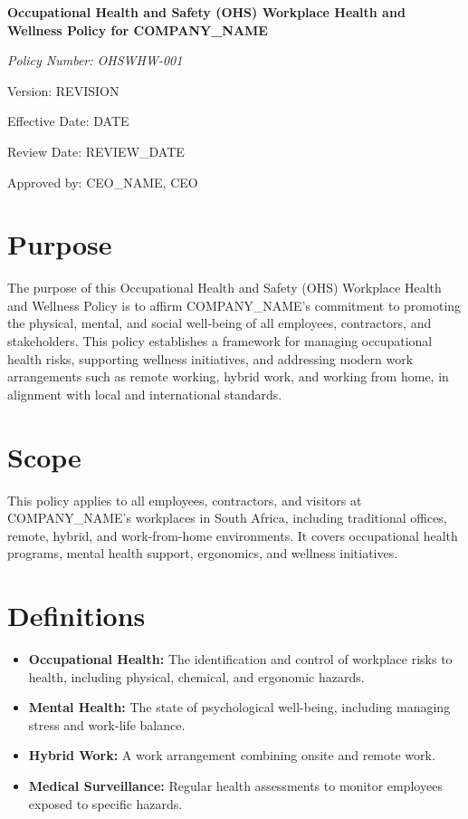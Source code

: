 \documentclass[12pt]{article}
\begin{document}
\begin{titlepage}
    \centering
    \vspace*{2cm}
    {\LARGE\bfseries Occupational Health and Safety (OHS) Workplace Health and Wellness Policy for {{COMPANY_NAME}}\par}
    \vspace{1cm}
    {\large\itshape Policy Number: OHSWHW-001\par}
    \vspace{0.5cm}
    {\normalsize Version: {{REVISION}}\par}
    \vspace{0.5cm}
    {\normalsize Effective Date: {{DATE}}\par}
    \vspace{0.5cm}
    {\normalsize Review Date: {{REVIEW_DATE}}\par}
    \vspace{2cm}
    {\normalsize Approved by: {{CEO_NAME}}, CEO\par}
\end{titlepage}

\section{Purpose}
The purpose of this Occupational Health and Safety (OHS) Workplace Health and Wellness Policy is to affirm {{COMPANY_NAME}}'s commitment to promoting the physical, mental, and social well-being of all employees, contractors, and stakeholders. This policy establishes a framework for managing occupational health risks, supporting wellness initiatives, and addressing modern work arrangements such as remote working, hybrid work, and working from home, in alignment with local and international standards.

\section{Scope}
This policy applies to all employees, contractors, and visitors at {{COMPANY_NAME}}’s workplaces in South Africa, including traditional offices, remote, hybrid, and work-from-home environments. It covers occupational health programs, mental health support, ergonomics, and wellness initiatives.

\section{Definitions}
\begin{itemize}
    \item \textbf{Occupational Health:} The identification and control of workplace risks to health, including physical, chemical, and ergonomic hazards.
    \item \textbf{Mental Health:} The state of psychological well-being, including managing stress and work-life balance.
    \item \textbf{Hybrid Work:} A work arrangement combining onsite and remote work.
    \item \textbf{Medical Surveillance:} Regular health assessments to monitor employees exposed to specific hazards.
\end{itemize}
\end{document}

